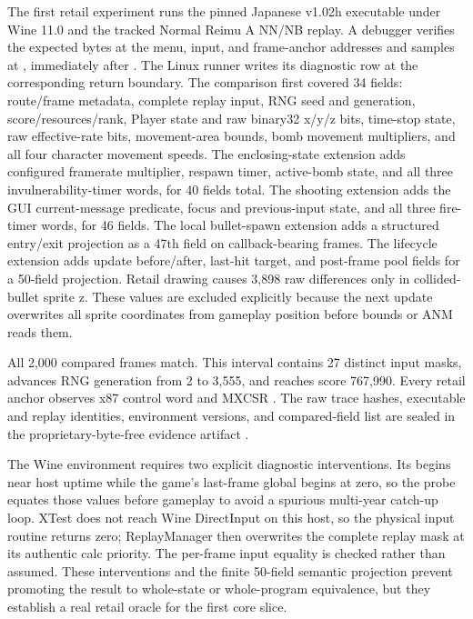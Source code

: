 The first retail experiment runs the pinned Japanese v1.02h executable under
Wine 11.0 and the tracked Normal Reimu A NN/NB replay.  A debugger verifies the
expected bytes at the menu, input, and frame-anchor addresses and samples at
, immediately after .  The Linux
runner writes its diagnostic row at the corresponding return boundary.  The
comparison first covered 34 fields: route/frame metadata, complete replay input, RNG
seed and generation, score/resources/rank, Player state and raw binary32 x/y/z
bits, time-stop state, raw effective-rate bits, movement-area bounds, bomb
movement multipliers, and all four character movement speeds.
The enclosing-state extension adds configured framerate multiplier, respawn
timer, active-bomb state, and all three invulnerability-timer words, for 40
fields total.  The shooting extension adds the GUI current-message predicate,
focus and previous-input state, and all three fire-timer words, for 46 fields.
The local bullet-spawn extension adds a structured entry/exit projection as a
47th field on callback-bearing frames.
The lifecycle extension adds update before/after, last-hit target, and
post-frame pool fields for a 50-field projection.  Retail drawing causes 3,898
raw differences only in collided-bullet sprite z.  These values are excluded
explicitly because the next update overwrites all sprite coordinates from
gameplay position before bounds or ANM reads them.

All 2,000 compared frames match.  This interval contains 27 distinct input
masks, advances RNG generation from 2 to 3,555, and reaches score 767,990.
Every retail anchor observes x87 control word  and MXCSR
.  The raw trace hashes, executable and replay identities,
environment versions, and compared-field list are sealed in the
proprietary-byte-free evidence artifact
.

The Wine environment requires two explicit diagnostic interventions.  Its
 begins near host uptime while the game's last-frame global
begins at zero, so the probe equates those values before gameplay to avoid a
spurious multi-year catch-up loop.  XTest does not reach Wine DirectInput on
this host, so the physical input routine returns zero; ReplayManager then
overwrites the complete replay mask at its authentic calc priority.  The
per-frame input equality is checked rather than assumed.  These interventions
and the finite 50-field semantic projection prevent promoting the result to whole-state
or whole-program equivalence, but they establish a real retail oracle for the
first core slice.

